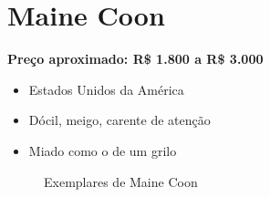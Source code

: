 \documentclass[a4paper]{article}
\begin{document}
  \section{Maine Coon}

  \bf{Pre\c{c}o aproximado:} R\$ 1.800 a R\$ 3.000

  \begin{itemize}
    \item Estados Unidos da Am\'erica
    \item D\'ocil, meigo, carente de aten\c{c}\~ao
    \item Miado como o de um grilo
  \end{itemize}

  \begin{figure}[ht]
    \centering

      

    \caption{Exemplares de Maine Coon}
    \label{fig:maine-coon}
  \end{figure}
\end{document}
